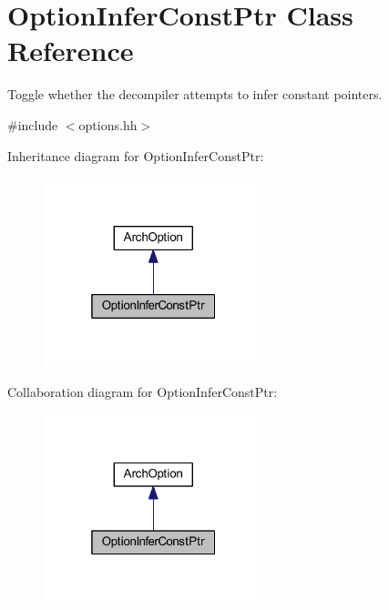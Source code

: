 \hypertarget{class_option_infer_const_ptr}{}\section{Option\+Infer\+Const\+Ptr Class Reference}
\label{class_option_infer_const_ptr}


Toggle whether the decompiler attempts to infer constant pointers.  




{\ttfamily \#include $<$options.\+hh$>$}



Inheritance diagram for Option\+Infer\+Const\+Ptr\+:
\nopagebreak
\begin{figure}[H]
\begin{center}
\leavevmode
\includegraphics[width=181pt]{class_option_infer_const_ptr__inherit__graph}
\end{center}
\end{figure}


Collaboration diagram for Option\+Infer\+Const\+Ptr\+:
\nopagebreak
\begin{figure}[H]
\begin{center}
\leavevmode
\includegraphics[width=181pt]{class_option_infer_const_ptr__coll__graph}
\end{center}
\end{figure}
